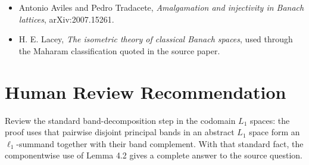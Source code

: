 \documentclass[11pt]{article}
\begin{document}
\begin{itemize}
\item Antonio Aviles and Pedro Tradacete,
\emph{Amalgamation and injectivity in Banach lattices},
arXiv:2007.15261.
\item H. E. Lacey, \emph{The isometric theory of classical Banach spaces},
used through the Maharam classification quoted in the source paper.
\end{itemize}

\section*{Human Review Recommendation}

Review the standard band-decomposition step in the codomain \(L_1\) spaces:
the proof uses that pairwise disjoint principal bands in an abstract \(L_1\)
space form an \(\ell_1\)-summand together with their band complement.  With
that standard fact, the componentwise use of Lemma 4.2 gives a complete answer
to the source question.
\end{document}
